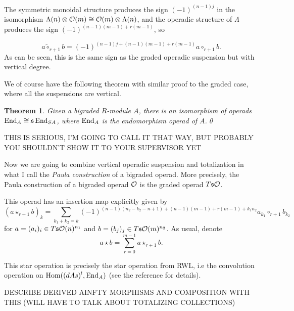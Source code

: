 \documentclass[twoside]{article}
\newtheorem{thm}[defin]{Theorem}
\begin{document}
The symmetric monoidal structure produces the sign $(-1)^{(n-1)j}$ in the isomorphism $\Lambda(n)\otimes {\mathcal O}(m)\cong{\mathcal O}(m)\otimes\Lambda(n)$, and the operadic structure of $\Lambda$ produces the sign $(-1)^{(n-1)(m-1)+r(m-1)}$, so 

\begin{equation}\label{sign}
a\tilde{\circ}_{r+1}b=(-1)^{(n-1)j+(n-1)(m-1)+r(m-1)}a\circ_{r+1} b.
\end{equation}
As can be seen, this is the same sign as the graded operadic suspension but with vertical degree.

We of course have the following theorem with similar proof to the graded case, where all the suspensions are vertical.
\begin{thm}\label{markl}
Given a bigraded $R$-module $A$, there is an isomorphism of operads $\operatorname{End}_{ A}\cong \mathfrak{s}\operatorname{End}_{SA}$, where $\operatorname{End}_A$ is the endomorphism operad of $A$.\qed
\end{thm}

 
 THIS IS SERIOUS, I'M GOING TO CALL IT THAT WAY, BUT PROBABLY YOU SHOULDN'T SHOW IT TO YOUR SUPERVISOR YET
 
Now we are going to combine vertical operadic suspension and totalization in what I call the \emph{Paula construction} of a bigraded operad. More precisely, the Paula construction of a bigraded operad ${\mathcal O}$ is the graded operad $T\mathfrak{s}{\mathcal O}$. 


This operad has an insertion map explicitly given by
\[(a\star_{r+1} b)_k=\sum_{k_1+k_2=k}(-1)^{(n-1)(n_2-k_2-n+1)+(n-1)(m-1)+r(m-1)+k_1n_2}a_{k_1}\circ_{r+1}b_{k_2}\]
for $a=(a_i)_i\in T\mathfrak{s}{\mathcal O}(n)^{n_1}$ and $b=(b_j)_j\in T\mathfrak{s}{\mathcal O}(m)^{n_2}$. As usual, denote \[a\star b=\sum_{r=0}^{m-1}a\star_{r+1}b.\]

This star operation is precisely the star operation from RWL, i.e the convolution operation on $\operatorname{Hom}((dAs)^!, \operatorname{End}_A)$ (see the reference for details). 

DESCRIBE DERIVED AINFTY MORPHISMS AND COMPOSITION WITH THIS (WILL HAVE TO TALK ABOUT TOTALIZING COLLECTIONS)
\end{document}

